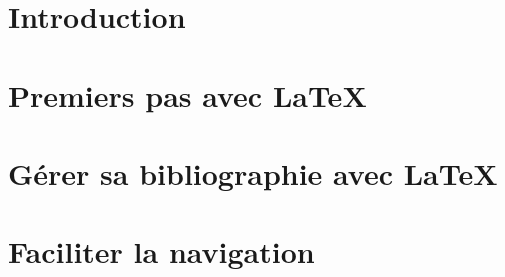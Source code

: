 \part{Introduction}




\part{Premiers pas avec \LaTeX}








\part{Gérer sa bibliographie avec \LaTeX}







\part{Faciliter la navigation}


